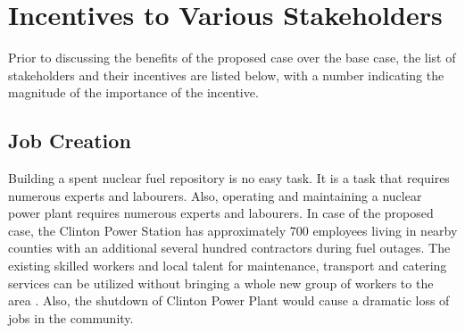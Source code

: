 \section {Incentives to Various Stakeholders}

Prior to discussing the benefits of the proposed case over the base case, the list of
 stakeholders and their incentives are listed below, with a number indicating the 
 magnitude of the importance of the incentive.
 
 
\begin{table}[h]

\centering
\caption {Incentive Criterion and Weight for Each Stakeholder}
\end{table}

\subsection{Job Creation}



Building a spent nuclear fuel repository is no easy task. It is a task that requires
numerous experts and labourers. Also, operating and maintaining a nuclear power plant
requires numerous experts and labourers. In case of the proposed case, the Clinton
 Power Station has approximately 700 employees living in nearby counties with an
additional several hundred contractors during fuel outages\cite{Exelon}.
The existing skilled workers and local talent for maintenance, transport and catering
services can be utilized without bringing a whole new group of workers to the area \cite{IAEA_2008}. Also, the shutdown of Clinton Power Plant would cause a dramatic
loss of jobs in the community. 


